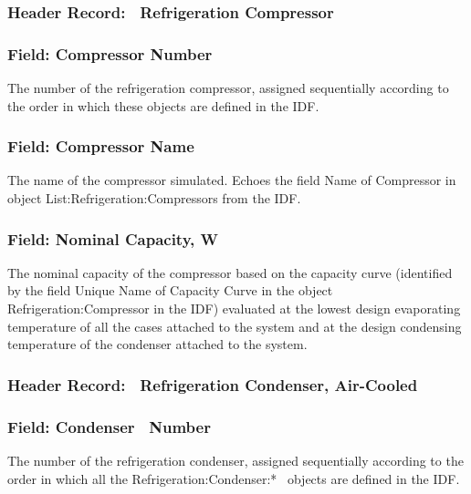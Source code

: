 \subsubsection{Header Record:~ Refrigeration Compressor}\label{header-record-refrigeration-compressor}

\subsubsection{Field: Compressor Number}\label{field-compressor-number}

The number of the refrigeration compressor, assigned sequentially according to the order in which these objects are defined in the IDF.

\subsubsection{Field: Compressor Name}\label{field-compressor-name}

The name of the compressor simulated. Echoes the field Name of Compressor in object List:Refrigeration:Compressors from the IDF.

\subsubsection{Field: Nominal Capacity, W}\label{field-nominal-capacity-w}

The nominal capacity of the compressor based on the capacity curve (identified by the field Unique Name of Capacity Curve in the object Refrigeration:Compressor in the IDF) evaluated at the lowest design evaporating temperature of all the cases attached to the system and at the design condensing temperature of the condenser attached to the system.

\subsubsection{Header Record:~ Refrigeration Condenser, Air-Cooled}\label{header-record-refrigeration-condenser-air-cooled}

\subsubsection{Field: Condenser~ Number}\label{field-condenser-number-1}

The number of the refrigeration condenser, assigned sequentially according to the order in which all the Refrigeration:Condenser:*~ objects are defined in the IDF.

